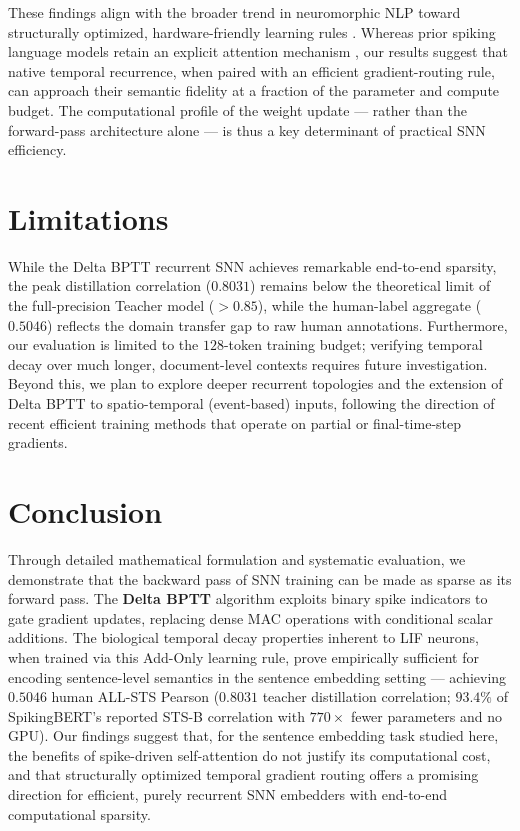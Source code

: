 \documentclass[11pt, conference, compsoc, twoside]{IEEEtran}
\begin{document}
These findings align with the broader trend in neuromorphic NLP toward structurally optimized, hardware-friendly learning rules \cite{neftci2019surrogate, zhou2023spikformer}. Whereas prior spiking language models retain an explicit attention mechanism \cite{zhou2023spikformer, zhu2023spikegpt, bal2024spikingbert}, our results suggest that native temporal recurrence, when paired with an efficient gradient-routing rule, can approach their semantic fidelity at a fraction of the parameter and compute budget. The computational profile of the weight update --- rather than the forward-pass architecture alone --- is thus a key determinant of practical SNN efficiency.

\section{Limitations}
While the Delta BPTT recurrent SNN achieves remarkable end-to-end sparsity, the peak distillation correlation ($0.8031$) remains below the theoretical limit of the full-precision Teacher model ($>0.85$), while the human-label aggregate ($0.5046$) reflects the domain transfer gap to raw human annotations. Furthermore, our evaluation is limited to the $128$-token training budget; verifying temporal decay over much longer, document-level contexts requires future investigation. Beyond this, we plan to explore deeper recurrent topologies and the extension of Delta BPTT to spatio-temporal (event-based) inputs, following the direction of recent efficient training methods that operate on partial or final-time-step gradients.

\section{Conclusion}
Through detailed mathematical formulation and systematic evaluation, we demonstrate that the backward pass of SNN training can be made as sparse as its forward pass. The \textbf{Delta BPTT} algorithm exploits binary spike indicators to gate gradient updates, replacing dense MAC operations with conditional scalar additions. The biological temporal decay properties inherent to LIF neurons, when trained via this Add-Only learning rule, prove empirically sufficient for encoding sentence-level semantics in the sentence embedding setting --- achieving $0.5046$ human ALL-STS Pearson ($0.8031$ teacher distillation correlation; $93.4\%$ of SpikingBERT's reported STS-B correlation with $770\times$ fewer parameters and no GPU). Our findings suggest that, for the sentence embedding task studied here, the benefits of spike-driven self-attention do not justify its computational cost, and that structurally optimized temporal gradient routing offers a promising direction for efficient, purely recurrent SNN embedders with end-to-end computational sparsity.
\end{document}
